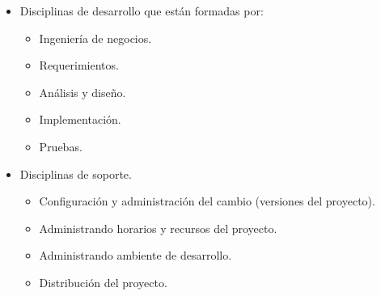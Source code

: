 \documentclass[12pt,twoside]{article}
\begin{document}
\begin{itemize}
    \item Disciplinas de desarrollo que están formadas por:
    \begin{itemize}
        \item Ingeniería de negocios.
        \item Requerimientos.
        \item Análisis y diseño.
        \item Implementación.
        \item Pruebas.
    \end{itemize}
    \item Disciplinas de soporte.
    \begin{itemize}
        \item Configuración y administración del cambio (versiones del proyecto).
        \item Administrando horarios y recursos del proyecto.
        \item Administrando ambiente de desarrollo.
        \item Distribución del proyecto.
    \end{itemize}
\end{itemize}
\end{document}
